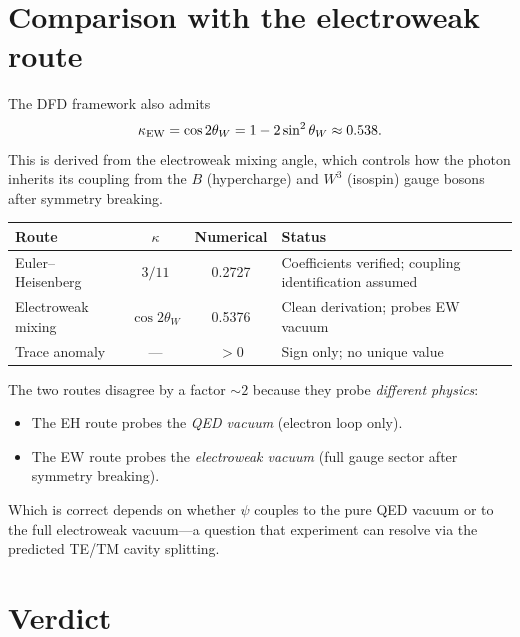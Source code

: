 \documentclass[12pt]{article}
\begin{document}
\section{Comparison with the electroweak route}

The DFD framework also admits
\begin{equation}
\kappa_{\rm EW} = \cos 2\theta_W = 1 - 2\sin^2\theta_W
\approx 0.538.
\end{equation}
This is derived from the electroweak mixing angle, which controls
how the photon inherits its coupling from the $B$ (hypercharge)
and $W^3$ (isospin) gauge bosons after symmetry breaking.

\begin{center}
\begin{tabular}{lccl}
\toprule
\textbf{Route} & $\kappa$ & \textbf{Numerical} & \textbf{Status} \\
\midrule
Euler--Heisenberg & $3/11$ & 0.2727 & Coefficients verified;
  coupling identification assumed \\
Electroweak mixing & $\cos 2\theta_W$ & 0.5376 & Clean derivation;
  probes EW vacuum \\
Trace anomaly & --- & $> 0$ & Sign only; no unique value \\
\bottomrule
\end{tabular}
\end{center}

The two routes disagree by a factor $\sim 2$ because they probe
\emph{different physics}:
\begin{itemize}
\item The EH route probes the \emph{QED vacuum} (electron loop only).
\item The EW route probes the \emph{electroweak vacuum} (full gauge
  sector after symmetry breaking).
\end{itemize}
Which is correct depends on whether $\psi$ couples to the pure QED
vacuum or to the full electroweak vacuum---a question that experiment
can resolve via the predicted TE/TM cavity splitting.

\section{Verdict}
\end{document}
